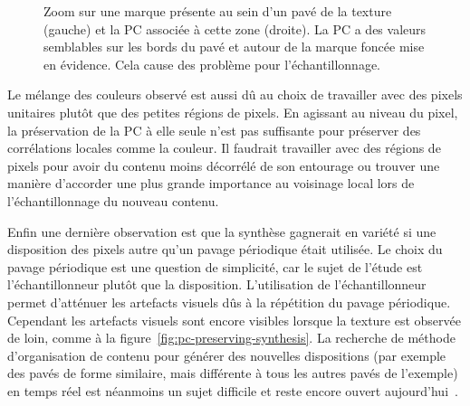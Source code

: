 \begin{figure}
    \caption[Problème d'échantillonnage dû à la présence de marques au sein des pavés de la texture]{Zoom sur une marque présente au sein d'un pavé de la texture (gauche) et la PC associée à cette zone (droite). La PC a des valeurs semblables sur les bords du pavé et autour de la marque foncée mise en évidence. Cela cause des problème pour l'échantillonnage.}
    \label{fig:pc-defect}
\end{figure}

Le mélange des couleurs observé est aussi dû au choix de travailler avec des pixels unitaires plutôt que des petites régions de pixels. En agissant au niveau du pixel, la préservation de la PC à elle seule n'est pas suffisante pour préserver des corrélations locales comme la couleur. Il faudrait travailler avec des régions de pixels pour avoir du contenu moins décorrélé de son entourage ou trouver une manière d'accorder une plus grande importance au voisinage local lors de l'échantillonnage du nouveau contenu.

\bigskip

Enfin une dernière observation est que la synthèse gagnerait en variété si une disposition des pixels autre qu'un pavage périodique était utilisée. Le choix du pavage périodique est une question de simplicité, car le sujet de l'étude est l'échantillonneur plutôt que la disposition. L'utilisation de l'échantillonneur permet d'atténuer les artefacts visuels dûs à la répétition du pavage périodique. Cependant les artefacts visuels sont encore visibles lorsque la texture est observée de loin, comme à la figure~\ref{fig:pc-preserving-synthesis}. La recherche de méthode d'organisation de contenu pour générer des nouvelles dispositions (par exemple des pavés de forme similaire, mais différente à tous les autres pavés de l'exemple) en temps réel est néanmoins un sujet difficile et reste encore ouvert aujourd'hui~\cite{baldi_differentiable_2023, guehl_semi-procedural_2020}.